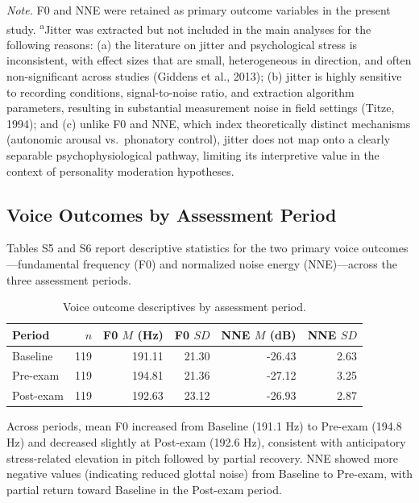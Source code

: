 \documentclass[
  english,
  man,floatsintext]{apa6}
\begin{document}
\begin{table}[p]
\begin{threeparttable}
\begin{tablenotes}
\footnotesize
\item \textit{Note.} F0 and NNE were retained as primary outcome variables in the present study. 
\textsuperscript{a}Jitter was extracted but not included in the main analyses for the following reasons: 
(a) the literature on jitter and psychological stress is inconsistent, with effect sizes that are small, heterogeneous in direction, and often non-significant across studies (Giddens et al., 2013); 
(b) jitter is highly sensitive to recording conditions, signal-to-noise ratio, and extraction algorithm parameters, resulting in substantial measurement noise in field settings (Titze, 1994); and 
(c) unlike F0 and NNE, which index theoretically distinct mechanisms (autonomic arousal vs.\ phonatory control), jitter does not map onto a clearly separable psychophysiological pathway, limiting its interpretive value in the context of personality moderation hypotheses.
\end{tablenotes}
\end{threeparttable}
\end{table}

\subsection{Voice Outcomes by Assessment Period}\label{voice-outcomes-by-assessment-period}

Tables S5 and S6 report descriptive statistics for the two primary voice outcomes---fundamental frequency (F0) and normalized noise energy (NNE)---across the three assessment periods.

\begin{table}

\caption{\label{tab:table-s4-voice}Voice outcome descriptives by assessment period.}
\centering
\begin{tabular}[t]{lrrrrr}
\toprule
Period & $n$ & F0 $M$ (Hz) & F0 $SD$ & NNE $M$ (dB) & NNE $SD$\\
\midrule
Baseline & 119 & 191.11 & 21.30 & -26.43 & 2.63\\
Pre-exam & 119 & 194.81 & 21.36 & -27.12 & 3.25\\
Post-exam & 119 & 192.63 & 23.12 & -26.93 & 2.87\\
\bottomrule
\end{tabular}
\end{table}

Across periods, mean F0 increased from Baseline (191.1 Hz) to Pre-exam (194.8 Hz) and decreased slightly at Post-exam (192.6 Hz), consistent with anticipatory stress-related elevation in pitch followed by partial recovery. NNE showed more negative values (indicating reduced glottal noise) from Baseline to Pre-exam, with partial return toward Baseline in the Post-exam period.
\end{document}
